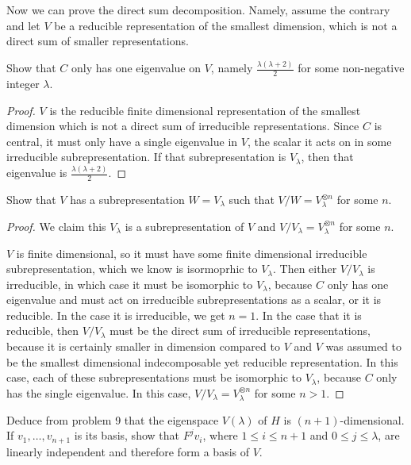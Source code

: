 \documentclass{article}
\begin{document}
Now we can prove the direct sum decomposition. Namely, assume the contrary and
let $V$ be a reducible representation of the smallest dimension, which is not a
direct sum of smaller representations.

\begin{prb}
Show that $C$ only has one eigenvalue on $V$, namely $\frac{\lambda (\lambda +
2)}{2}$ for some non-negative integer $\lambda$.
\end{prb}

\begin{proof}
$V$ is the reducible finite dimensional representation of the smallest dimension
which is not a direct sum of irreducible representations. Since $C$ is central,
it must only have a single eigenvalue in $V$, the scalar it acts on in some
irreducible subrepresentation. If that subrepresentation is $V_{\lambda}$, then
that eigenvalue is $\frac{\lambda (\lambda + 2)}{2}$.
\end{proof}

\begin{prb}
Show that $V$ has a subrepresentation $W = V_{\lambda}$ such that $V / W =
V_{\lambda}^{\otimes n}$ for some $n$.
\end{prb}

\begin{proof}
We claim this $V_{\lambda}$ is a subrepresentation of $V$ and $V / V_{\lambda} =
V_{\lambda}^{\otimes n}$ for some $n$.

$V$ is finite dimensional, so it must have some finite dimensional irreducible
subrepresentation, which we know is isormoprhic to $V_{\lambda}$. Then either $V
/ V_{\lambda}$ is irreducible, in which case it must be isomorphic to
$V_{\lambda}$, because $C$ only has one eigenvalue and must act on irreducible
subrepresentations as a scalar, or it is reducible. In the case it is
irreducible, we get $n = 1$. In the case that it is reducible, then $V /
V_{\lambda}$ must be the direct sum of irreducible representations, because it
is certainly smaller in dimension compared to $V$ and $V$ was assumed to be the
smallest dimensional indecomposable yet reducible representation. In this case,
each of these subrepresentations must be isomorphic to $V_{\lambda}$, because
$C$ only has the single eigenvalue. In this case, $V / V_{\lambda} =
V_{\lambda}^{\otimes n}$ for some $n > 1$.
\end{proof}

\begin{prb}
Deduce from problem 9 that the eigenspace $V(\lambda)$ of $H$ is $(n +
1)$-dimensional. If $v_1, \dots, v_{n + 1}$ is its basis, show that $F^j v_i$,
where $1 \leq i \leq n + 1$ and $0 \leq j \leq \lambda$, are linearly
independent and therefore form a basis of $V$.
\end{prb}
\end{document}
